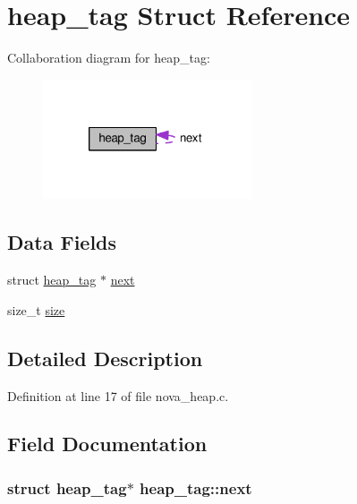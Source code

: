 \hypertarget{structheap__tag}{\section{heap\-\_\-tag Struct Reference}
\label{structheap__tag}
}


Collaboration diagram for heap\-\_\-tag\-:\nopagebreak
\begin{figure}[H]
\begin{center}
\leavevmode
\includegraphics[width=175pt]{structheap__tag__coll__graph}
\end{center}
\end{figure}
\subsection*{Data Fields}
\begin{DoxyCompactItemize}
\item 
struct \hyperlink{structheap__tag}{heap\-\_\-tag} $\ast$ \hyperlink{structheap__tag_ae0e42d810512a9636393bab081921a7c}{next}
\item 
size\-\_\-t \hyperlink{structheap__tag_aa492677962c3d48df0880c9dacea3564}{size}
\end{DoxyCompactItemize}


\subsection{Detailed Description}


Definition at line 17 of file nova\-\_\-heap.\-c.



\subsection{Field Documentation}
\hypertarget{structheap__tag_ae0e42d810512a9636393bab081921a7c}{
\subsubsection[{next}]{\setlength{\rightskip}{0pt plus 5cm}struct {\bf heap\-\_\-tag}$\ast$ heap\-\_\-tag\-::next}}\label{structheap__tag_ae0e42d810512a9636393bab081921a7c}


